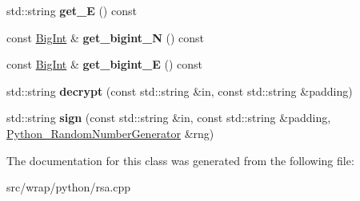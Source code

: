 \begin{DoxyCompactItemize}
\item 
\hypertarget{classPy__RSA__PrivateKey_a6ebc0c4768116ac5b53b53955e9ca9c0}{std\-::string {\bfseries get\-\_\-\-E} () const }\label{classPy__RSA__PrivateKey_a6ebc0c4768116ac5b53b53955e9ca9c0}

\item 
\hypertarget{classPy__RSA__PrivateKey_a5b087d14ac50d49d0bf8a7002a37530c}{const \hyperlink{classBotan_1_1BigInt}{Big\-Int} \& {\bfseries get\-\_\-bigint\-\_\-\-N} () const }\label{classPy__RSA__PrivateKey_a5b087d14ac50d49d0bf8a7002a37530c}

\item 
\hypertarget{classPy__RSA__PrivateKey_a7d950f322126cda2b4a0e529dee3c307}{const \hyperlink{classBotan_1_1BigInt}{Big\-Int} \& {\bfseries get\-\_\-bigint\-\_\-\-E} () const }\label{classPy__RSA__PrivateKey_a7d950f322126cda2b4a0e529dee3c307}

\item 
\hypertarget{classPy__RSA__PrivateKey_aa30c134ea85c60c0857701f48d4f61ef}{std\-::string {\bfseries decrypt} (const std\-::string \&in, const std\-::string \&padding)}\label{classPy__RSA__PrivateKey_aa30c134ea85c60c0857701f48d4f61ef}

\item 
\hypertarget{classPy__RSA__PrivateKey_ab682fc69926a368223398f46320e1472}{std\-::string {\bfseries sign} (const std\-::string \&in, const std\-::string \&padding, \hyperlink{classPython__RandomNumberGenerator}{Python\-\_\-\-Random\-Number\-Generator} \&rng)}\label{classPy__RSA__PrivateKey_ab682fc69926a368223398f46320e1472}

\end{DoxyCompactItemize}


The documentation for this class was generated from the following file\-:\begin{DoxyCompactItemize}
\item 
src/wrap/python/rsa.\-cpp\end{DoxyCompactItemize}
